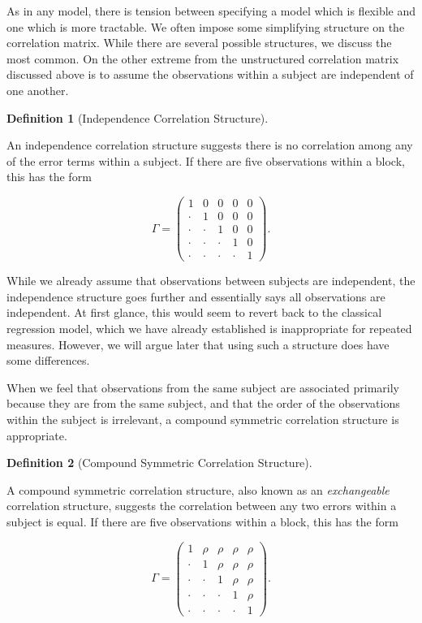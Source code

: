 \documentclass[
  letterpaper,
  DIV=11,
  numbers=noendperiod]{scrreprt}
\theoremstyle{definition}
\theoremstyle{definition}
\newtheorem{definition}{Definition}[chapter]
\theoremstyle{remark}
\begin{document}
As in any model, there is tension between specifying a model which is
flexible and one which is more tractable. We often impose some
simplifying structure on the correlation matrix. While there are several
possible structures, we discuss the most common. On the other extreme
from the unstructured correlation matrix discussed above is to assume
the observations within a subject are independent of one another.

\begin{definition}[Independence Correlation
Structure]\protect\hypertarget{def-independence-correlation-structure}{}\label{def-independence-correlation-structure}

An independence correlation structure suggests there is no correlation
among any of the error terms within a subject. If there are five
observations within a block, this has the form

\[\Gamma = \begin{pmatrix} 
1 & 0 & 0 & 0 & 0 \\
\cdot & 1 & 0 & 0 & 0 \\
\cdot & \cdot & 1 & 0 & 0 \\
\cdot & \cdot & \cdot & 1 & 0 \\
\cdot & \cdot & \cdot & \cdot & 1 \end{pmatrix}.\]

\end{definition}

While we already assume that observations between subjects are
independent, the independence structure goes further and essentially
says all observations are independent. At first glance, this would seem
to revert back to the classical regression model, which we have already
established is inappropriate for repeated measures. However, we will
argue later that using such a structure does have some differences.

When we feel that observations from the same subject are associated
primarily because they are from the same subject, and that the order of
the observations within the subject is irrelevant, a compound symmetric
correlation structure is appropriate.

\begin{definition}[Compound Symmetric Correlation
Structure]\protect\hypertarget{def-compound-symmetric-correlation-structure}{}\label{def-compound-symmetric-correlation-structure}

A compound symmetric correlation structure, also known as an
\emph{exchangeable} correlation structure, suggests the correlation
between any two errors within a subject is equal. If there are five
observations within a block, this has the form

\[\Gamma = \begin{pmatrix} 
1 & \rho & \rho & \rho & \rho \\
\cdot & 1 & \rho & \rho & \rho \\
\cdot & \cdot & 1 & \rho & \rho \\
\cdot & \cdot & \cdot & 1 & \rho \\
\cdot & \cdot & \cdot & \cdot & 1 \end{pmatrix}.\]

\end{definition}
\end{document}
